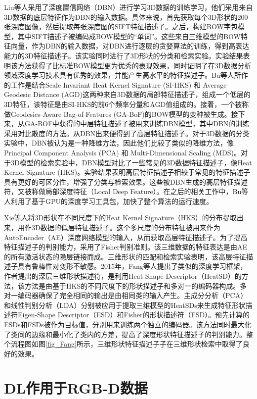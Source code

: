 \documentclass[twoside,UTF8]{nputhesis}
\begin{document}
Liu等人\cite{Liu2014High}采用了深度置信网络（DBN）进行学习3D数据的训练学习，他们采用来自3D数据的底层特征作为DBN的输入数据。具体来说，首先获取每个3D形状的200张深度图像，然后提取每张深度图的SIFT特征描述子。之后，构建BOW字包模型，其中SIFT描述子被编码成BOW模型的``单词''。这些来自三维模型的BOW特征向量，作为DBN的输入数据，对DBN进行逐层的贪婪算法的训练，得到高表达能力的3D特征描述子。该实验同时进行了3D形状的分类和检索实验。实验结果表明该方法获得了比标准BOW模型更为优秀的表现效果，同时证明了在3D数据分析领域深度学习技术具有优秀的效果，并能产生高水平的特征描述子。Bu等人\cite{Bu2014Learning}所作的工作是结合Scale Invariant Heat Kernel Signature (SI-HKS) 和 Average Geodesic Distance (AGD)这两种来自3D数据的局部特征描述子，组成一个低层的3D特征，该特征是由SI-HKS的前6个频率分量和AGD值组成的。接着，一个被称做Geodesics-Aware Bag-of-Features (GA-BoF)的BOW模型的变种被生成。接下来，从GA-BOF中获得的中层特征描述子被用来训练DBN模型，其中DBN的训练采用对比散度的方法。从DBN出来便得到了高层特征描述子。对于3D数据的分类实验中，DBN被认为是一种降维方法，因此他们比较了类似的降维方法，像Principal Component Analysis (PCA) 和 Multi-Dimensional Scaling (MDS)。对于3D模型的检索实验中，DBN模型对比了一些常见的3D数据特征描述子，像Heat Kernel Signature (HKS)。实验结果表明高层特征描述子相较于常见的特征描述子具有更好的可区分性，增强了分类与检索效果。这些被DBN生成的高层特征描述符，又被称做局部深度特征（Local Deep Feature）。在之后的相关工作中，Bu等人利用了基于GPU的深度学习工具包，加快了整个算法的运行速度。

Xie等人\cite{Xie2015Deepshape}将3D形状在不同尺度下的Heat Kernel Signature（HKS）的分布提取出来，用作3D数据的低层特征描述子。这个多尺度的分布特征被用来作为AutoEncoder（AE）深度网络模型的输入，从而获取高层特征描述子。为了提高特征描述子的判别能力，采用了Fisher判别准则。该三维数据的特征表达是由AE的所有激活状态的隐层链接而成。三维形状的匹配和检索实验表明，该高层特征描述子具有鲁棒性对变形不敏感。2015年，Fang等人\cite{Fang20153D}提出了类似的深度学习框架，作者提出的深层三维形状描述符，是利用Heat Shape Descriptor（HeatSD）的方法，该方法是由基于HKS的不同尺度下的形状描述子和多对一的编码器构成。多对一编码器确保了完全相同的输出是由相同类的输入产生。主成分分析（PCA）和线性判别分析（LDA）分别被应用于提取三维模型的HeatSDs来生成特征形状描述符Eigen-Shape Descriptor（ESD）和Fisher的形状描述符（FSD）。预先计算的ESDs和FSDs被作为目标值，分别用来训练两个独立的编码器。该方法同时最大化了类间的边缘和最小化了类内的方差，提高了深度形状特征描述子的判别能力。整个流程图如图\ref{fig_Fang}所示，三维形状特征描述子子在三维形状检索中取得了良好的效果。

\section{DL作用于RGB-D数据}
\end{document}
